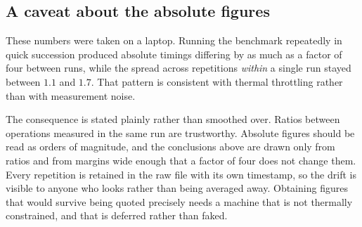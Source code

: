\subsection{A caveat about the absolute figures}
\label{sec:tech:bench:caveat}

These numbers were taken on a laptop. Running the benchmark repeatedly in quick
succession produced absolute timings differing by as much as a factor of four
between runs, while the spread across repetitions \emph{within} a single run
stayed between $1.1$ and $1.7$. That pattern is consistent with thermal
throttling rather than with measurement noise.

The consequence is stated plainly rather than smoothed over. Ratios between
operations measured in the same run are trustworthy. Absolute figures should be
read as orders of magnitude, and the conclusions above are drawn only from
ratios and from margins wide enough that a factor of four does not change them.
Every repetition is retained in the raw file with its own timestamp, so the
drift is visible to anyone who looks rather than being averaged away. Obtaining
figures that would survive being quoted precisely needs a machine that is not
thermally constrained, and that is deferred rather than faked.
